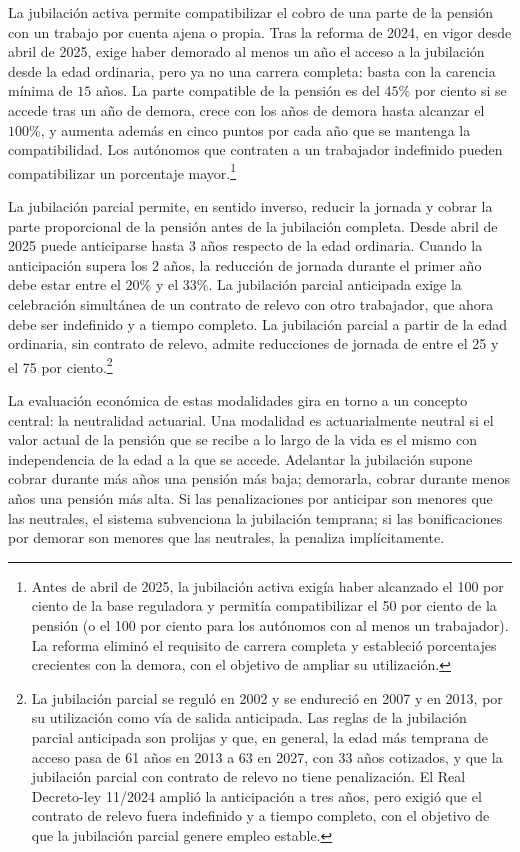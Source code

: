 \documentclass[10pt,a4paper]{article}
\begin{document}
La jubilación activa permite compatibilizar el cobro de una parte de la pensión con un trabajo por cuenta ajena o propia. Tras la reforma de 2024, en vigor desde abril de 2025, exige haber demorado al menos un año el acceso a la jubilación desde la edad ordinaria, pero ya no una carrera completa: basta con la carencia mínima de $15$ años. La parte compatible de la pensión es del $45\%$ por ciento si se accede tras un año de demora, crece con los años de demora hasta alcanzar el $100\%$, y aumenta además en cinco puntos por cada año que se mantenga la compatibilidad. Los autónomos que contraten a un trabajador indefinido pueden compatibilizar un porcentaje mayor.\footnote{Antes de abril de 2025, la jubilación activa exigía haber alcanzado el 100 por ciento de la base reguladora y permitía compatibilizar el 50 por ciento de la pensión (o el 100 por ciento para los autónomos con al menos un trabajador). La reforma eliminó el requisito de carrera completa y estableció porcentajes crecientes con la demora, con el objetivo de ampliar su utilización.
}

La jubilación parcial permite, en sentido inverso, reducir la jornada y cobrar la parte proporcional de la pensión antes de la jubilación completa. Desde abril de 2025 puede anticiparse hasta $3$ años respecto de la edad ordinaria. Cuando la anticipación supera los $2$ años, la reducción de jornada durante el primer año debe estar entre el $20\%$ y el $33\%$. La jubilación parcial anticipada exige la celebración simultánea de un contrato de relevo con otro trabajador, que ahora debe ser indefinido y a tiempo completo. La jubilación parcial a partir de la edad ordinaria, sin contrato de relevo, admite reducciones de jornada de entre el 25 y el 75 por ciento.\footnote{La jubilación parcial se reguló en 2002 y se endureció en 2007 y en 2013, por su utilización como vía de salida anticipada. Las reglas de la jubilación parcial anticipada son prolijas y que, en general, la edad más temprana de acceso pasa de 61 años en 2013 a 63 en 2027, con 33 años cotizados, y que la jubilación parcial con contrato de relevo no tiene penalización. El Real Decreto-ley 11/2024 amplió la anticipación a tres años, pero exigió que el contrato de relevo fuera indefinido y a tiempo completo, con el objetivo de que la jubilación parcial genere empleo estable.
}

La evaluación económica de estas modalidades gira en torno a un concepto central: la neutralidad actuarial. Una modalidad es actuarialmente neutral si el valor actual de la pensión que se recibe a lo largo de la vida es el mismo con independencia de la edad a la que se accede. Adelantar la jubilación supone cobrar durante más años una pensión más baja; demorarla, cobrar durante menos años una pensión más alta. Si las penalizaciones por anticipar son menores que las neutrales, el sistema subvenciona la jubilación temprana; si las bonificaciones por demorar son menores que las neutrales, la penaliza implícitamente.
\end{document}
